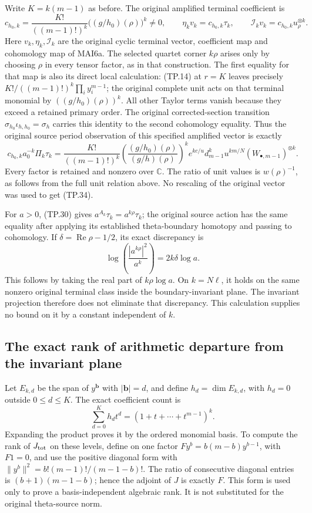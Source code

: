 Write \(K=k(m-1)\) as before. The original amplified terminal
coefficient is
\[
 c_{h_0,k}=\frac{K!}{((m-1)!)^k}
             \bigl((g/h_0)(\rho)\bigr)^k\ne0,
 \qquad \eta_k v_k=c_{h_0,k}\tau_k,
 \qquad \mathcal I_kv_k=c_{h_0,k}u_\rho^{\otimes k}.
 \tag{TP.33}\label{eq:tp-MAIscalar}
\]
Here \(v_k,\eta_k,\mathcal I_k\) are the original cyclic
terminal vector, coefficient map and cohomology map of MAI6a.
The selected quartet corner \(k\rho\) arises only by choosing
\(\rho\) in every tensor factor, as in that construction.
The first equality for that map is also its direct local
calculation: (TP.14) at \(r=K\) leaves precisely
\(K!/((m-1)!)^k\prod_i y_i^{m-1}\); the original complete unit
acts on that terminal monomial by \(((g/h_0)(\rho))^k\).
All other Taylor terms vanish because they exceed a retained
primary order. The original corrected-section transition
\(\sigma_{h_0}\iota_{h,h_0}=\sigma_h\) carries this identity
to the second cohomology equality. Thus the original source
period observation of this specified amplified vector is
exactly
\[
 c_{h_0,k}a_0^{-k}\Pi_k\tau_k
 =\frac{K!}{((m-1)!)^k}
       \left(\frac{(g/h_0)(\rho)}{(g/h)(\rho)}\right)^k
       e^{kc/u}d_{m-1}^k u^{km/N}(W_{\bullet,m-1})^{\otimes k}.
 \tag{TP.34}\label{eq:tp-MAIperiod}
\]
Every factor is retained and nonzero over \(\mathbb C\).
The ratio of unit values is \(w(\rho)^{-1}\), as follows
from the full unit relation above. No rescaling of the
original vector was used to get (TP.34).

For \(a>0\), (TP.30) gives
\(a^{A_k}\tau_k=a^{k\rho}\tau_k\); the original source
action has the same equality after applying its established
theta-boundary homotopy and passing to cohomology. If
\(\delta=\operatorname{Re}\rho-1/2\), its exact discrepancy is
\[
 \log\!\left(\frac{|a^{k\rho}|^2}{a^k}\right)
        =2k\delta\log a.
 \tag{TP.35}\label{eq:tp-terminaldiscrepancy}
\]
This follows by taking the real part of \(k\rho\log a\).
On \(k=N\ell\), it holds on the same nonzero original
terminal class inside the boundary-invariant plane.
The invariant projection therefore does not eliminate
that discrepancy. This calculation supplies no bound
on it by a constant independent of \(k\).

\subsection{The exact rank of arithmetic departure from the invariant plane}

Let \(E_{k,d}\) be the span of \(y^{\mathbf b}\) with
\(|\mathbf b|=d\), and define \(h_d=\dim E_{k,d}\), with
\(h_d=0\) outside \(0\leq d\leq K\). The exact coefficient
count is
\[
 \sum_{d=0}^K h_d t^d=(1+t+\cdots+t^{m-1})^k.
 \tag{TP.36}\label{eq:tp-hilbert}
\]
Expanding the product proves it by the ordered monomial
basis. To compute the rank of \(J_{\rm tot}\) on these
levels, define on one factor
\(Fy^b=b(m-b)y^{b-1}\), with \(F1=0\), and use the
positive diagonal form with
\(\|y^b\|^2=b!(m-1)!/(m-1-b)!\).
The ratio of consecutive diagonal entries is
\((b+1)(m-1-b)\); hence the adjoint of \(J\) is exactly
\(F\). This form is used only to prove a basis-independent
algebraic rank. It is not substituted for the original
theta-source norm.

